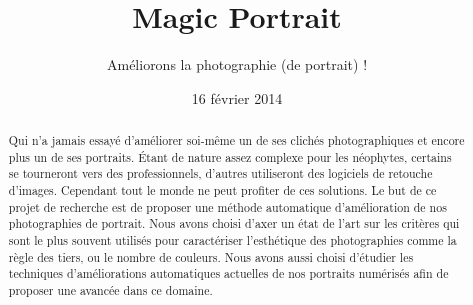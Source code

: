 \documentclass[11pt, french]{report-rd-info}
\begin{document}
\title{Magic Portrait}
\subtitle{Améliorons la photographie (de portrait) !}
\date{16 février 2014}
\begin{abstract}
Qui n'a jamais essayé d'améliorer soi-même un de ses clichés photographiques et encore plus un de ses portraits. Étant de nature assez complexe pour les néophytes, certains se tourneront vers des professionnels, d'autres utiliseront des logiciels de retouche d'images. Cependant tout le monde ne peut profiter de ces solutions.  Le but de ce projet de recherche est de proposer une méthode automatique d'amélioration de nos photographies de portrait. Nous avons choisi d'axer un état de l'art sur les critères qui sont le plus souvent utilisés pour caractériser l'esthétique des photographies comme la règle des tiers, ou le nombre de couleurs. Nous avons aussi choisi d'étudier les techniques d'améliorations automatiques actuelles de nos portraits numérisés afin de proposer une avancée dans ce domaine.
\end{abstract}
\end{document}
